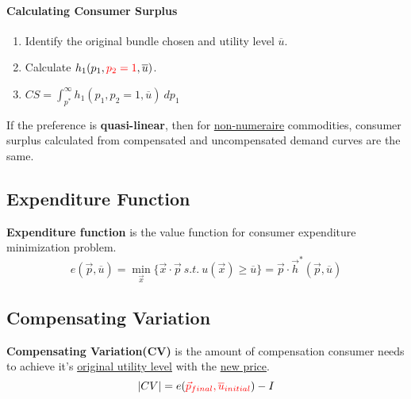 \documentclass[]{article}
\begin{document}
            \paragraph{Calculating Consumer Surplus}
            \begin{enumerate}
                \item Identify the original bundle chosen and utility level $\overline{u}$.
                \item Calculate $h_1(p_1, \textcolor{red}{p_2=1},\overline{u})$.
                \item $CS = \int_{p^*}^{\infty}{h_1(p_1,p_2=1,\overline{u})}\ dp_1$
            \end{enumerate}
            
            \begin{remark}
                If the preference is \textbf{quasi-linear}, then for \ul{non-numeraire} commodities, consumer surplus calculated from compensated and uncompensated demand curves are the same.
            \end{remark}
        
        \subsection{Expenditure Function}
            \begin{definition}
                \textbf{Expenditure function} is the value function for consumer expenditure minimization problem.
                \[
                    e(\vec{p}, \overline{u}) = \min_{\vec{x}} \{\vec{x} \cdot \vec{p}\ s.t.\ u(\vec{x}) \geq \overline{u}\} = \vec{p} \cdot \vec{h}^*(\vec{p}, \overline{u})
                \]
            \end{definition}
        
        \subsection{Compensating Variation}
            \begin{definition}
                \textbf{Compensating Variation(CV)} is the amount of compensation consumer needs to achieve it's \ul{original utility level} with the \ul{new price}.
                \[
                    |CV| = e(
                    \textcolor{red}{
                        \vec{p}_{final}, \overline{u}_{initial}
                        }) - I
                \]
            \end{definition}
            
\end{document}
